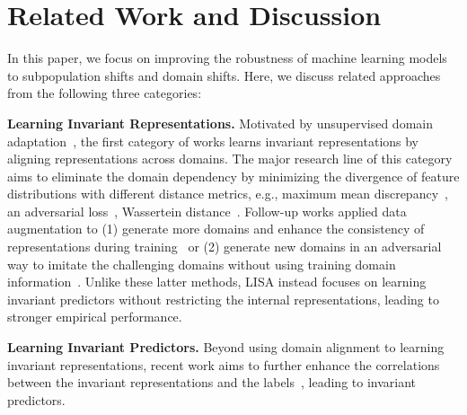 \section{Related Work and Discussion}
In this paper, we focus on improving the robustness of machine learning models to subpopulation shifts and domain shifts. Here, we discuss related approaches from the following three categories:

\textbf{Learning Invariant Representations.} Motivated by unsupervised domain adaptation~\citep{ben2010theory,ganin2016domain}, the first category of works learns invariant representations by aligning representations across domains. %
The major research line of this category aims to eliminate the domain dependency by minimizing the divergence of feature distributions with different distance metrics, e.g., maximum mean discrepancy~\citep{tzeng2014deep,long2015learning}, an adversarial loss~\citep{ganin2016domain,li2018domain}, Wassertein distance~\citep{zhou2020domain}. Follow-up works applied data augmentation to (1) generate more domains and enhance the consistency of representations during training~\citep{yue2019domain,zhou2020deep,xu2020adversarial,yan2020improve,shu2021open,wang2020heterogeneous,yao2021meta} or (2) generate new domains in an adversarial way to imitate the challenging domains without using training domain information~\citep{zhao2020maximum,qiao2020learning,volpi2018generalizing}. Unlike these latter methods, LISA instead focuses on learning invariant predictors without restricting the internal representations, leading to stronger empirical performance.


\textbf{Learning Invariant Predictors.} Beyond using domain alignment to learning invariant representations, recent work aims to further enhance the correlations between the invariant representations and the labels~\citep{koyama2020out}, leading to invariant predictors. 

